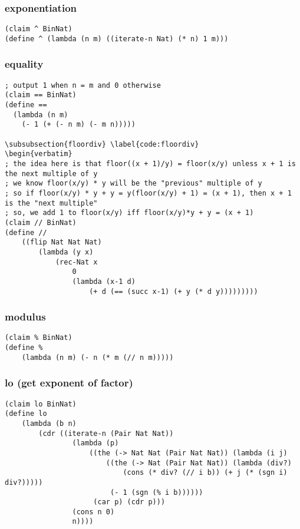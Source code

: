 \subsubsection{exponentiation} \label{code:exponentiation}
\begin{verbatim}
(claim ^ BinNat)
(define ^ (lambda (n m) ((iterate-n Nat) (* n) 1 m)))
\end{verbatim}

\subsubsection{equality} \label{code:equality}
\begin{verbatim}
; output 1 when n = m and 0 otherwise
(claim == BinNat)
(define ==
  (lambda (n m)
    (- 1 (+ (- n m) (- m n)))))

\subsubsection{floordiv} \label{code:floordiv}
\begin{verbatim}
; the idea here is that floor((x + 1)/y) = floor(x/y) unless x + 1 is the next multiple of y
; we know floor(x/y) * y will be the "previous" multiple of y
; so if floor(x/y) * y + y = y(floor(x/y) + 1) = (x + 1), then x + 1 is the "next multiple"
; so, we add 1 to floor(x/y) iff floor(x/y)*y + y = (x + 1)
(claim // BinNat)
(define // 
    ((flip Nat Nat Nat)
        (lambda (y x)
            (rec-Nat x
                0
                (lambda (x-1 d) 
                    (+ d (== (succ x-1) (+ y (* d y)))))))))
\end{verbatim}

\subsubsection{modulus} \label{code:modulus}
\begin{verbatim}
(claim % BinNat)
(define %
    (lambda (n m) (- n (* m (// n m)))))
\end{verbatim}

\subsubsection{lo (get exponent of factor)} \label{code:lo}
\begin{verbatim}
(claim lo BinNat)
(define lo
    (lambda (b n)
        (cdr ((iterate-n (Pair Nat Nat))
                (lambda (p)
                    ((the (-> Nat Nat (Pair Nat Nat)) (lambda (i j) 
                        ((the (-> Nat (Pair Nat Nat)) (lambda (div?) 
                            (cons (* div? (// i b)) (+ j (* (sgn i) div?)))))
                         (- 1 (sgn (% i b))))))
                     (car p) (cdr p)))
                (cons n 0)
                n))))
\end{verbatim}

